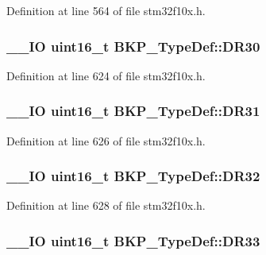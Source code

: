 Definition at line 564 of file stm32f10x.\-h.

\hypertarget{struct_b_k_p___type_def_a7413138b9d21280f51975d9f80c66826}{
\subsubsection[{D\-R30}]{\setlength{\rightskip}{0pt plus 5cm}\-\_\-\-\_\-\-I\-O {\bf uint16\-\_\-t} B\-K\-P\-\_\-\-Type\-Def\-::\-D\-R30}}\label{struct_b_k_p___type_def_a7413138b9d21280f51975d9f80c66826}


Definition at line 624 of file stm32f10x.\-h.

\hypertarget{struct_b_k_p___type_def_a59e675eaee3b1035123bc6d21a19e153}{
\subsubsection[{D\-R31}]{\setlength{\rightskip}{0pt plus 5cm}\-\_\-\-\_\-\-I\-O {\bf uint16\-\_\-t} B\-K\-P\-\_\-\-Type\-Def\-::\-D\-R31}}\label{struct_b_k_p___type_def_a59e675eaee3b1035123bc6d21a19e153}


Definition at line 626 of file stm32f10x.\-h.

\hypertarget{struct_b_k_p___type_def_af55d82fdc7570503f812dc3ba895ed61}{
\subsubsection[{D\-R32}]{\setlength{\rightskip}{0pt plus 5cm}\-\_\-\-\_\-\-I\-O {\bf uint16\-\_\-t} B\-K\-P\-\_\-\-Type\-Def\-::\-D\-R32}}\label{struct_b_k_p___type_def_af55d82fdc7570503f812dc3ba895ed61}


Definition at line 628 of file stm32f10x.\-h.

\hypertarget{struct_b_k_p___type_def_a8f15e1d81071ebe109d6558acd8f3d9a}{
\subsubsection[{D\-R33}]{\setlength{\rightskip}{0pt plus 5cm}\-\_\-\-\_\-\-I\-O {\bf uint16\-\_\-t} B\-K\-P\-\_\-\-Type\-Def\-::\-D\-R33}}\label{struct_b_k_p___type_def_a8f15e1d81071ebe109d6558acd8f3d9a}


